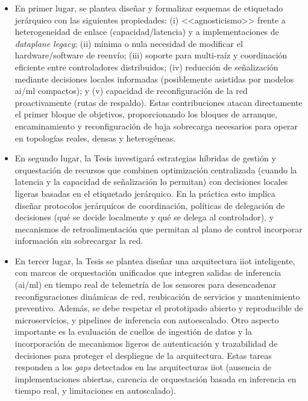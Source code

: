\begin{itemize}
    \item En primer lugar, se plantea diseñar y formalizar esquemas de etiquetado jerárquico con las siguientes propiedades: (i) <<agnosticismo>> frente a heterogeneidad de enlace (capacidad/latencia) y a implementaciones de \textit{dataplane legacy}; (ii) mínima o nula necesidad de modificar el hardware/software de reenvío; (iii) soporte para multi-raíz y coordinación eficiente entre controladores distribuidos; (iv) reducción de señalización mediante decisiones locales informadas (posiblemente asistidas por modelos \gls{ai}/\gls{ml} compactos); y (v) capacidad de reconfiguración de la red proactivamente (rutas de respaldo). Estas contribuciones atacan directamente el primer bloque de objetivos, proporcionando los bloques de arranque, encaminamiento y reconfiguración de baja sobrecarga necesarios para operar en topologías reales, densas y heterogéneas.

    \item En segundo lugar, la Tesis investigará estrategias híbridas de gestión y orquestación de recursos que combinen optimización centralizada (cuando la latencia y la capacidad de señalización lo permitan) con decisiones locales ligeras basadas en el etiquetado jerárquico. En la práctica esto implica diseñar protocolos jerárquicos de coordinación, políticas de delegación de decisiones (qué se decide localmente y qué se delega al controlador), y mecanismos de retroalimentación que permitan al plano de control incorporar información sin sobrecargar la red. 

    \item En tercer lugar, la Tesis se plantea diseñar una arquitectura \gls{iiot} inteligente, con marcos de orquestación unificados que integren salidas de inferencia (\gls{ai}/\gls{ml}) en tiempo real de telemetría de los sensores para desencadenar reconfiguraciones dinámicas de red, reubicación de servicios y mantenimiento preventivo. Además, se debe respetar el prototipado abierto y reproducible de microservicios, y pipelines de inferencia con autoescalado. Otro aspecto importante es la evaluación de cuellos de ingestión de datos y la incorporación de mecanismos ligeros de autenticación y trazabilidad de decisiones para proteger el despliegue de la arquitectura. Estas tareas responden a los \textit{gaps} detectados en las arquitecturas \gls{iiot} (ausencia de implementaciones abiertas, carencia de orquestación basada en inferencia en tiempo real, y limitaciones en autoscalado).
\end{itemize}

